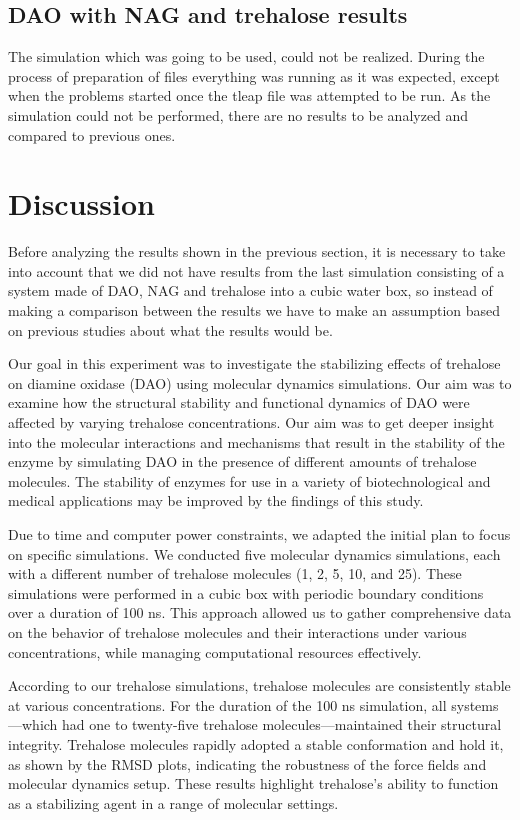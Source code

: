\documentclass[12pt,twoside]{article}
\begin{document}
\subsection{DAO with NAG and trehalose results}

The simulation which was going to be used, could not be realized. During the process of preparation of files everything was running as it was expected, except when the problems started once the tleap file was attempted to be run.
As the simulation could not be performed, there are no results to be analyzed and compared to previous ones.

\clearpage
\section{Discussion}




Before analyzing the results shown in the previous section, it is necessary to take into account that we did not have results from the last simulation consisting of a system made of DAO, NAG and trehalose into a cubic water box, so instead of making a comparison between the results we have to make an assumption based on previous studies about what the results would be.

Our goal in this experiment was to investigate the stabilizing effects of trehalose on diamine oxidase (DAO) using molecular dynamics simulations. Our aim was to examine how the structural stability and functional dynamics of DAO were affected by varying trehalose concentrations. Our aim was to get deeper insight into the molecular interactions and mechanisms that result in the stability of the enzyme by simulating DAO in the presence of different amounts of trehalose molecules. The stability of enzymes for use in a variety of biotechnological and medical applications may be improved by the findings of this study.

Due to time and computer power constraints, we adapted the initial plan to focus on specific simulations. We conducted five molecular dynamics simulations, each with a different number of trehalose molecules (1, 2, 5, 10, and 25). These simulations were performed in a cubic box with periodic boundary conditions over a duration of 100 ns. This approach allowed us to gather comprehensive data on the behavior of trehalose molecules and their interactions under various concentrations, while managing computational resources effectively.

According to our trehalose simulations, trehalose molecules are consistently stable at various concentrations. For the duration of the 100 ns simulation, all systems—which had one to twenty-five trehalose molecules—maintained their structural integrity. Trehalose molecules rapidly adopted a stable conformation and hold it, as shown by the RMSD plots, indicating the robustness of the force fields and molecular dynamics setup. These results highlight trehalose's ability to function as a stabilizing agent in a range of molecular settings.
\end{document}

